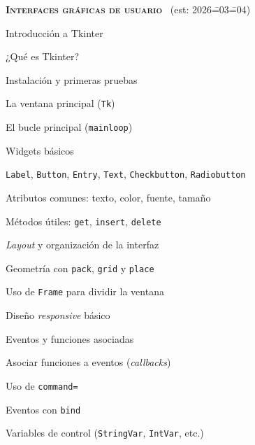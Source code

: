 \begin{longenum}
\begin{longenum}
    \end{longenum}
    \item \textbf{\textsc{Interfaces gráficas de usuario}} \ (est: 2026\==03\==04)
    \begin{longenum}
        \item Introducción a Tkinter
        \begin{longenum}
            \item ¿Qué es Tkinter?
            \item Instalación y primeras pruebas
            \item La ventana principal (\texttt{Tk})
            \item El bucle principal (\texttt{mainloop})
        \end{longenum}
        \item Widgets básicos
        \begin{longenum}
            \item \texttt{Label}, \texttt{Button}, \texttt{Entry}, \texttt{Text}, \texttt{Checkbutton}, \texttt{Radiobutton}
            \item Atributos comunes: texto, color, fuente, tamaño
            \item Métodos útiles: \texttt{get}, \texttt{insert}, \texttt{delete}
        \end{longenum}
        \item \textit{Layout} y organización de la interfaz
        \begin{longenum}
            \item Geometría con \texttt{pack}, \texttt{grid} y \texttt{place}
            \item Uso de \texttt{Frame} para dividir la ventana
            \item Diseño \textit{responsive} básico
        \end{longenum}
        \item Eventos y funciones asociadas
        \begin{longenum}
            \item Asociar funciones a eventos (\textit{callbacks})
            \item Uso de \texttt{command=}
            \item Eventos con \texttt{bind}
            \item Variables de control (\texttt{StringVar}, \texttt{IntVar}, etc.)
        \end{longenum}
    \end{longenum}

\end{longenum}
